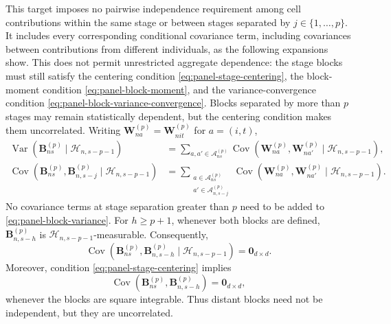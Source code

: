 \documentclass[11pt]{article}
\renewcommand\vec[1]{\boldsymbol{#1}}
\newcommand\mat[1]{\mathbf{#1}}
\DeclareMathOperator{\Cov}{Cov}
\DeclareMathOperator{\Var}{Var}
\newcommand{\Hcal}{\mathcal{H}}
\newcommand{\A}{\mathcal{A}}
\theoremstyle{definition}
\begin{document}
This target imposes no pairwise independence requirement among cell
contributions within the same stage or between stages separated by
\(j\in\{1,\ldots,p\}\). It includes every corresponding conditional
covariance term, including covariances between contributions from
different individuals, as the following expansions show. This does not
permit unrestricted aggregate dependence: the stage blocks must still
satisfy the centering condition
\eqref{eq:panel-stage-centering}, the block-moment condition
\eqref{eq:panel-block-moment}, and the variance-convergence condition
\eqref{eq:panel-block-variance-convergence}. Blocks separated by more
than \(p\) stages may remain statistically dependent, but the centering
condition makes them uncorrelated.
Writing \(\vec W^{(p)}_{na}=\vec W^{(p)}_{nit}\) for \(a=(i,t)\),
\begin{align*}
\Var(\vec B^{(p)}_{ns}\mid\Hcal_{n,s-p-1})
&=
\sum_{a,a'\in\A^{(p)}_{ns}}
\Cov(\vec W^{(p)}_{na},\vec W^{(p)}_{na'}
\mid\Hcal_{n,s-p-1}),\\
\Cov(\vec B^{(p)}_{ns},\vec B^{(p)}_{n,s-j}
\mid\Hcal_{n,s-p-1})
&=
\sum_{\substack{a\in\A^{(p)}_{ns}\\
a'\in\A^{(p)}_{n,s-j}}}
\Cov(\vec W^{(p)}_{na},\vec W^{(p)}_{na'}
\mid\Hcal_{n,s-p-1}).
\end{align*}
No covariance terms at stage separation greater than \(p\) need to be
added to \eqref{eq:panel-block-variance}. For \(h\geq p+1\), whenever
both blocks are defined, \(\vec B^{(p)}_{n,s-h}\) is
\(\Hcal_{n,s-p-1}\)-measurable. Consequently,
\[
\Cov\!\left(
\vec B^{(p)}_{ns},\vec B^{(p)}_{n,s-h}
\mid\Hcal_{n,s-p-1}
\right)
=\mat{0}_{d\times d}.
\]
Moreover, condition \eqref{eq:panel-stage-centering} implies
\begin{equation}\label{eq:panel-distant-covariance}
\Cov(\vec B^{(p)}_{ns},\vec B^{(p)}_{n,s-h})
=\mat{0}_{d\times d},
\end{equation}
whenever the blocks are square integrable.
Thus distant blocks need not be independent, but they are uncorrelated.
\end{document}
